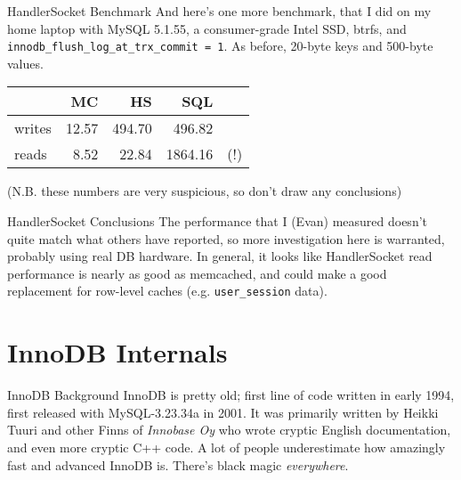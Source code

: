 \documentclass[14pt]{beamer}
\begin{document}
\begin{frame}{HandlerSocket Benchmark}
  And here's one more benchmark, that I did on my home laptop with MySQL 5.1.55,
  a consumer-grade Intel SSD, btrfs, and
  \texttt{innodb\_flush\_log\_at\_trx\_commit = 1}. As before, 20-byte keys and
  500-byte values.

  \begin{table}[ht]
  \begin{tabular}{l r r r l}
           & MC    & HS     & SQL     & \\ \hline
    writes & 12.57 & 494.70 & 496.82  & \\
    reads  & 8.52  & 22.84  & 1864.16 & (!)\\
  \end{tabular}
  \end{table}
  (N.B. these numbers are very suspicious, so don't draw any conclusions)
\end{frame}

\begin{frame}{HandlerSocket Conclusions}
  The performance that I (Evan) measured doesn't quite match what others have
  reported, so more investigation here is warranted, probably using real DB
  hardware.
  \newline
  \newline
  In general, it looks like HandlerSocket read performance is nearly as good as
  memcached, and could make a good replacement for row-level caches (e.g. \texttt{user\_session} data).
\end{frame}

\section{InnoDB Internals}

\begin{frame}{InnoDB Background}
  InnoDB is pretty old; first line of code written in early 1994, first released
  with MySQL-3.23.34a in 2001.
  \newline
  \newline
  It was primarily written by Heikki Tuuri and other Finns of \emph{Innobase Oy}
  who wrote cryptic English documentation, and even more cryptic C++ code.
  \newline
  \newline
  A lot of people underestimate how amazingly fast and advanced InnoDB
  is. There's black magic \emph{everywhere}.
\end{frame}
\end{document}
